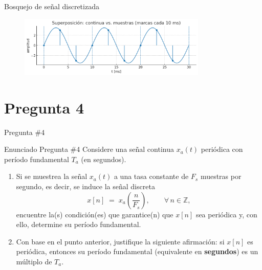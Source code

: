 \documentclass[
    10pt,
    aspectratio=169,
    xcolor={dvipsnames},
    spanish,
    ]{beamer}
\begin{document}
\begin{frame}
  \begin{block}{Bosquejo de señal discretizada}
  \end{block}
  \begin{figure}
    \includegraphics[width=0.8\textwidth]{Auxiliar_1_4.png}
  \end{figure}
\end{frame}
\section{Pregunta 4}
\begin{frame}{Pregunta \#4}
\begin{block}{Enunciado Pregunta \#4}
Considere una señal continua \(x_a(t)\) periódica con período fundamental \(T_a\) (en segundos).

\begin{enumerate}
  \item Si se muestrea la señal \(x_a(t)\) a una tasa constante de \(F_s\) muestras por segundo, es decir, se induce la señal discreta
  \begin{equation}
    x[n] \;=\; x_a\!\left(\frac{n}{F_s}\right), \qquad \forall\, n\in\mathbb{Z},
  \end{equation}
  encuentre la(s) condición(es) que garantice(n) que \(x[n]\) sea periódica y, con ello, determine su período fundamental.

  \item Con base en el punto anterior, justifique la siguiente afirmación:
  si \(x[n]\) es periódica, entonces su período fundamental (equivalente en \textbf{segundos}) es un múltiplo de \(T_a\).
\end{enumerate}
\end{block}
\end{frame}
\end{document}
